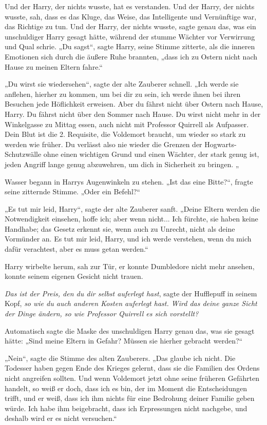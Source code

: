 {Und der Harry, der nichts wusste, hat es verstanden. Und der Harry, der nichts wusste, sah, dass es das Kluge, das Weise, das Intelligente und Vernünftige war, das Richtige zu tun. Und der Harry, der nichts wusste, sagte genau das, was ein unschuldiger Harry gesagt hätte, während der stumme Wächter vor Verwirrung und Qual schrie. „Du sagst“, sagte Harry, seine Stimme zitterte, als die inneren Emotionen sich durch die äußere Ruhe brannten, „dass ich zu Ostern nicht nach Hause zu meinen Eltern fahre.“

„Du wirst sie wiedersehen“, sagte der alte Zauberer schnell. „Ich werde sie anflehen, hierher zu kommen, um bei dir zu sein, ich werde ihnen bei ihren Besuchen jede Höflichkeit erweisen. Aber du fährst nicht über Ostern nach Hause, Harry. Du fährst nicht über den Sommer nach Hause. Du wirst nicht mehr in der Winkelgasse zu Mittag essen, auch nicht mit Professor Quirrell als Aufpasser. Dein Blut ist die 2. Requisite, die Voldemort braucht, um wieder so stark zu werden wie früher. Du verlässt also nie wieder die Grenzen der Hogwarts-Schutzwälle ohne einen wichtigen Grund und einen Wächter, der stark genug ist, jeden Angriff lange genug abzuwehren, um dich in Sicherheit zu bringen. „

Wasser begann in Harrys Augenwinkeln zu stehen. „Ist das eine Bitte?“, fragte seine zitternde Stimme. „Oder ein Befehl?“

„Es tut mir leid, Harry“, sagte der alte Zauberer sanft. „Deine Eltern werden die Notwendigkeit einsehen, hoffe ich; aber wenn nicht... Ich fürchte, sie haben keine Handhabe; das Gesetz erkennt sie, wenn auch zu Unrecht, nicht als deine Vormünder an. Es tut mir leid, Harry, und ich werde verstehen, wenn du mich dafür verachtest, aber es muss getan werden.“

Harry wirbelte herum, sah zur Tür, er konnte Dumbledore nicht mehr ansehen, konnte seinem eigenen Gesicht nicht trauen.

\emph{Das ist der Preis, den du dir selbst auferlegt hast}, sagte der Hufflepuff in seinem Kopf, \emph{so wie du auch anderen Kosten auferlegt hast. Wird das deine ganze Sicht der Dinge ändern, so wie Professor Quirrell es sich vorstellt?}

Automatisch sagte die Maske des unschuldigen Harry genau das, was sie gesagt hätte: „Sind meine Eltern in Gefahr? Müssen sie hierher gebracht werden?“

„Nein“, sagte die Stimme des alten Zauberers. „Das glaube ich nicht. Die Todesser haben gegen Ende des Krieges gelernt, dass sie die Familien des Ordens nicht angreifen sollten. Und wenn Voldemort jetzt ohne seine früheren Gefährten handelt, so weiß er doch, dass ich es bin, der im Moment die Entscheidungen trifft, und er weiß, dass ich ihm nichts für eine Bedrohung deiner Familie geben würde. Ich habe ihm beigebracht, dass ich Erpressungen nicht nachgebe, und deshalb wird er es nicht versuchen.“

}
